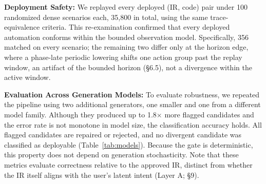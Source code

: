\documentclass[sigconf,nonacm,anonymous,review]{acmart}
\begin{document}
\textbf{Deployment Safety:} %
We replayed every deployed (IR, code) pair under 100 randomized dense scenarios each, 35,800 in total, using the same trace-equivalence criteria. %
This re-examination confirmed that every deployed automation conforms within the bounded observation model.
Specifically, 356 matched on every scenario; the remaining two differ only at the horizon edge, where a phase-late periodic lowering shifts one action group past the replay window, an artifact of the bounded horizon (\S6.5), not a divergence within the active window.

\textbf{Evaluation Across Generation Models:} 
To evaluate robustness, we repeated the pipeline using two additional generators, one smaller and one from a different model family. Although they %
produced up to 1.8$\times$ more flagged candidates and the error rate is not monotone in model size, the classification accuracy holds. All flagged candidates are repaired or rejected, and no divergent candidate was classified as deployable
(Table~\ref{tab:models}). Because the gate is deterministic, this property does not depend on generation stochasticity. Note that these metrics evaluate correctness relative to the approved IR, distinct from whether the IR itself aligns with the user's latent intent %
(Layer A; \S9).
\end{document}
